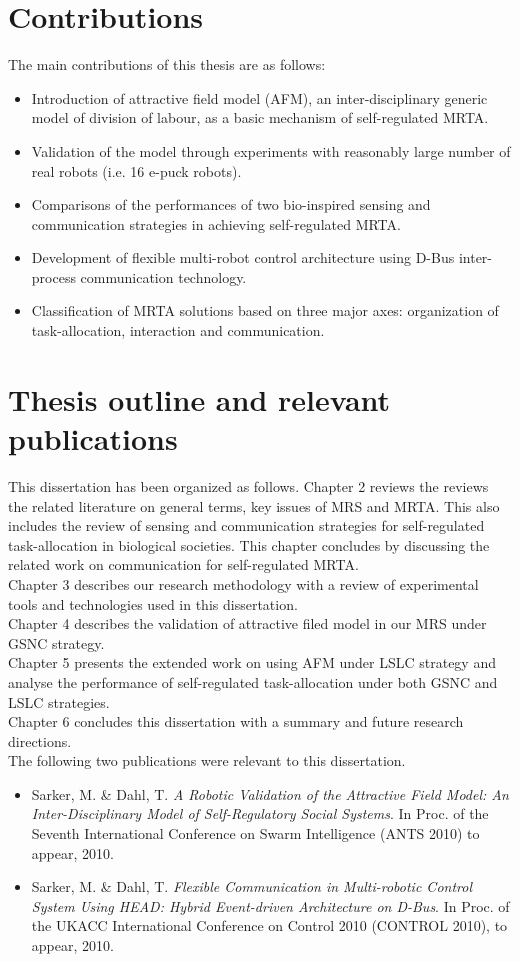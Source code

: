 \section{Contributions}
The main contributions of this thesis are as follows:
\begin{itemize}
\item Introduction of attractive field model (AFM), an  inter-disciplinary generic model of division of labour, as a basic mechanism of  self-regulated MRTA.
\item Validation of the model through experiments with reasonably large number of real robots (i.e. 16 e-puck robots).
\item Comparisons of the performances of two bio-inspired sensing and communication strategies in achieving self-regulated MRTA.
\item Development of flexible multi-robot control architecture using D-Bus inter-process communication technology.
\item Classification of MRTA solutions based on three major axes: organization of task-allocation, interaction and communication. 
\end{itemize}
\section{Thesis outline and relevant publications}
This dissertation has been organized as follows.
Chapter 2  reviews the reviews the related literature on general terms, key issues of MRS and MRTA. This also includes the review of sensing and  communication strategies  for self-regulated task-allocation in biological societies. This chapter concludes by discussing the related work on communication for self-regulated MRTA.\\
Chapter 3 describes our research methodology with a review of experimental tools and technologies used in this dissertation.\\
Chapter 4 describes the validation of attractive filed model in our MRS under GSNC strategy.\\
Chapter 5 presents the extended work on using AFM under LSLC strategy and analyse the  performance of self-regulated task-allocation under both GSNC and LSLC strategies.\\
Chapter 6 concludes this dissertation  with a summary and future research directions.\\
The following two publications were relevant to this dissertation.
\begin{itemize}
\item Sarker, M. \& Dahl, T.\textit{ A Robotic Validation of the Attractive Field Model: An Inter-Disciplinary Model of Self-Regulatory Social Systems}. In Proc. of the Seventh International Conference on Swarm Intelligence (ANTS 2010) to appear, 2010.
\item Sarker, M. \& Dahl, T. \textit{Flexible Communication in Multi-robotic Control System Using HEAD: Hybrid Event-driven Architecture on D-Bus}. In Proc. of the UKACC International Conference on Control 2010 (CONTROL 2010), to appear, 2010.
\end{itemize}
